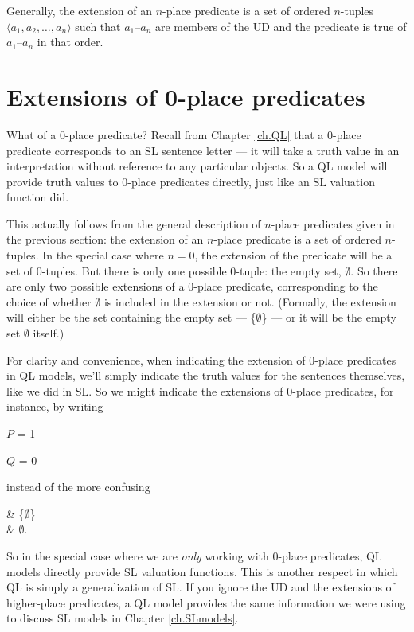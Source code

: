 Generally, the extension of an $n$-place predicate is a set of ordered $n$-tuples ${\langle}a_1, a_2,\ldots, a_n{\rangle}$ such that $a_1$--$a_n$ are members of the UD and the predicate is true of $a_1$--$a_n$ in that order.


\section{Extensions of 0-place predicates}
\label{sec.0PlaceModels}

What of a 0-place predicate? Recall from Chapter \ref{ch.QL} that a 0-place predicate corresponds to an SL sentence letter --- it will take a truth value in an interpretation without reference to any particular objects. So a QL model will provide truth values to 0-place predicates directly, just like an SL valuation function did.

This actually follows from the general description of $n$-place predicates given in the previous section: the extension of an $n$-place predicate is a set of ordered $n$-tuples. In the special case where $n=0$, the extension of the predicate will be a set of 0-tuples. But there is only one possible 0-tuple: the empty set, $\emptyset$. So there are only two possible extensions of a 0-place predicate, corresponding to the choice of whether $\emptyset$ is included in the extension or not. (Formally, the extension will either be the set containing the empty set --- \{$\emptyset$\} --- or it will be the empty set $\emptyset$ itself.)

For clarity and convenience, when indicating the extension of 0-place predicates in QL models, we'll simply indicate the truth values for the sentences themselves, like we did in SL. So we might indicate the extensions of 0-place predicates, for instance, by writing

\begin{ekey}
\item{$P$} = 1
\item{$Q$} = 0
\end{ekey}

instead of the more confusing

\begin{partialmodel}
	 & \{$\emptyset$\}\\
	 & $\emptyset$. \\
\end{partialmodel}

So in the special case where we are \emph{only} working with 0-place predicates, QL models directly provide SL valuation functions. This is another respect in which QL is simply a generalization of SL. If you ignore the UD and the extensions of higher-place predicates, a QL model provides the same information we were using to discuss SL models in Chapter \ref{ch.SLmodels}.

